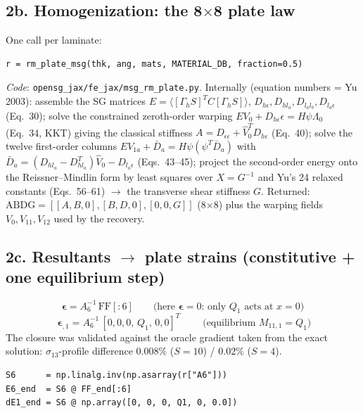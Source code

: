 \documentclass[11pt]{article}
\newcommand{\code}[1]{\texttt{#1}}
\begin{document}
\subsection*{2b.  Homogenization: the 8$\times$8 plate law}
One call per laminate:
\begin{verbatim}
r = rm_plate_msg(thk, ang, mats, MATERIAL_DB, fraction=0.5)
\end{verbatim}
\emph{Code}: \code{opensg\_jax/fe\_jax/msg\_rm\_plate.py}.  Internally (equation
numbers = Yu 2003): assemble the SG matrices $E = \langle[\Gamma_h S]^TC[\Gamma_hS]\rangle$,
$D_{h\epsilon}, D_{hl_a}, D_{l_al_b}, D_{l_a\epsilon}$ (Eq.~30); solve the constrained
zeroth-order warping $EV_0 + D_{h\epsilon}\epsilon = H\psi\Lambda_0$ (Eq.~34, KKT) giving
the classical stiffness $A = D_{\epsilon\epsilon} + \hat V_0^TD_{h\epsilon}$ (Eq.~40);
solve the twelve first-order columns $EV_{1a} + \bar D_a = H\psi(\psi^T\bar D_a)$ with
$\bar D_a = (D_{hl_a}-D_{hl_a}^T)\hat V_0 - D_{l_a\epsilon}$ (Eqs.~43--45); project the
second-order energy onto the Reissner--Mindlin form by least squares over
$X = G^{-1}$ and Yu's 24 relaxed constants (Eqs.~56--61) $\rightarrow$ the transverse
shear stiffness $G$.  Returned: $\mathrm{ABDG} = [[A,B,0],[B,D,0],[0,0,G]]$ (8$\times$8)
plus the warping fields $V_0, V_{11}, V_{12}$ used by the recovery.

\subsection*{2c.  Resultants $\rightarrow$ plate strains (constitutive + one equilibrium step)}
\begin{equation}
\bm\epsilon = A_6^{-1}\,\mathrm{FF}[{:}6]
\qquad\text{(here } \bm\epsilon = 0\text{: only } Q_1 \text{ acts at } x{=}0\text{)}
\end{equation}
\begin{equation}
\boxed{\;\bm\epsilon_{,1} = A_6^{-1}\,[0,0,0,\,Q_1,\,0,0]^T\;}
\qquad\text{(equilibrium } M_{11,1} = Q_1\text{)}
\end{equation}
The closure was validated against the oracle gradient taken from the exact solution:
$\sigma_{13}$-profile difference $0.008\%$ ($S{=}10$) / $0.02\%$ ($S{=}4$).
\begin{verbatim}
S6      = np.linalg.inv(np.asarray(r["A6"]))
E6_end  = S6 @ FF_end[:6]
dE1_end = S6 @ np.array([0, 0, 0, Q1, 0, 0.0])
\end{verbatim}
\end{document}
